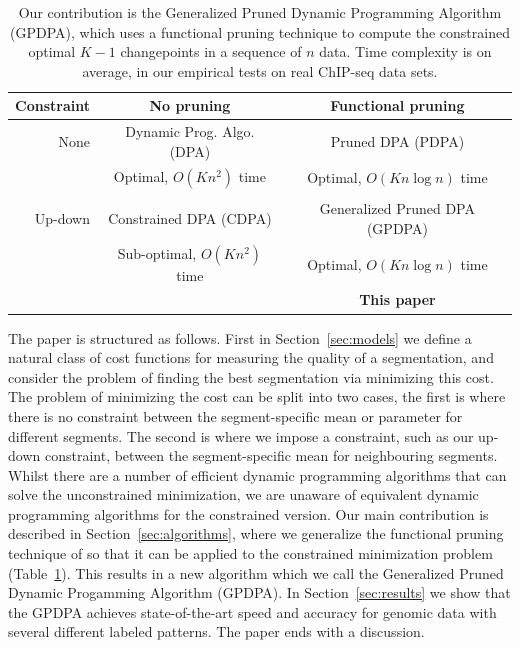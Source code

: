 \documentclass[aoas]{imsart}
\begin{document}
\begin{table}[b!]
  \centering
  \begin{tabular}{r|c|c}
    Constraint & No pruning & Functional pruning \\
    \hline
    None & Dynamic Prog. Algo. (DPA) & Pruned DPA (PDPA) \\
    & Optimal, $O(Kn^2)$ time & Optimal, $O(Kn\log n)$ time\\
    & \citet{segment-neighborhood}     & \citet{pruned-dp, phd-johnson} \\
    \hline
    Up-down & Constrained DPA (CDPA) & Generalized Pruned DPA (GPDPA) \\
    & Sub-optimal, $O(Kn^2)$ time & Optimal, $O(Kn\log n)$ time\\
    & \citet{HOCKING-PeakSeg} & \textbf{This paper} \\
    \hline
  \end{tabular}
  \caption{Our contribution is 
the Generalized Pruned Dynamic Programming Algorithm (GPDPA), 
 which uses a functional pruning technique 
    to compute the constrained optimal $K-1$ changepoints 
in a sequence of $n$ data. 
Time complexity is on average, 
in our empirical tests on real ChIP-seq data sets.}
\label{tab:contribution}
\end{table}

The paper is structured as follows. First in Section~\ref{sec:models} we define a natural class of cost functions for 
measuring the quality of a segmentation, and consider the problem of finding the best segmentation
via minimizing this cost. The problem of minimizing the cost can be split into two cases, the first
is where there is no constraint between the segment-specific mean or parameter for different segments. The
second is where we impose a constraint, such as our up-down constraint, between the segment-specific
mean for neighbouring segments. Whilst there are a number of efficient dynamic programming algorithms
that can solve the unconstrained minimization, we are unaware of equivalent dynamic programming
algorithms for the constrained version.  Our main contribution is described in 
Section~\ref{sec:algorithms}, where we generalize the functional pruning
technique of \citet{pruned-dp} so that it can be applied to the constrained minimization problem (Table~\ref{tab:contribution}). This
results in a new algorithm which we call the Generalized
Pruned Dynamic Progamming Algorithm (GPDPA). In Section~\ref{sec:results} 
we show that the GPDPA achieves state-of-the-art speed and accuracy for genomic data with
several different labeled patterns. The paper ends with a discussion.
\end{document}
